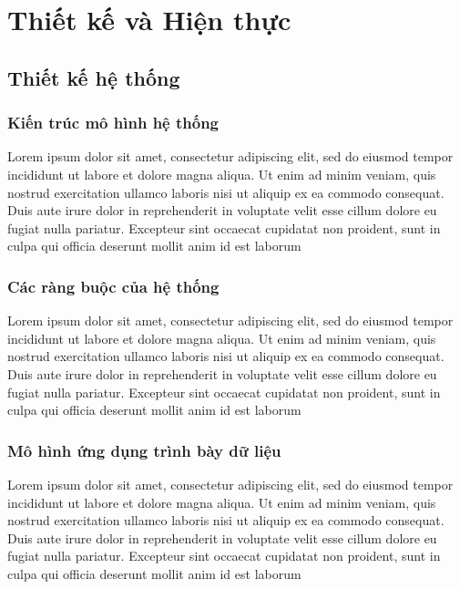 \ifpdf
\graphicspath{{Chapter3/Figs/Raster/}{Chapter3/Figs/PDF/}{Chapter3/Figs/}}
\else
\graphicspath{{Chapter3/Figs/Vector/}{Chapter3/Figs/}}
\fi

\chapter{Thiết kế và Hiện thực}

\section{Thiết kế hệ thống}
\subsection{Kiến trúc mô hình hệ thống}
Lorem ipsum dolor sit amet, consectetur adipiscing elit, sed do eiusmod tempor incididunt ut labore et dolore magna aliqua. Ut enim ad minim veniam, quis nostrud exercitation ullamco laboris nisi ut aliquip ex ea commodo consequat. Duis aute irure dolor in reprehenderit in voluptate velit esse cillum dolore eu fugiat nulla pariatur. Excepteur sint occaecat cupidatat non proident, sunt in culpa qui officia deserunt mollit anim id est laborum
\subsection{Các ràng buộc của hệ thống}
Lorem ipsum dolor sit amet, consectetur adipiscing elit, sed do eiusmod tempor incididunt ut labore et dolore magna aliqua. Ut enim ad minim veniam, quis nostrud exercitation ullamco laboris nisi ut aliquip ex ea commodo consequat. Duis aute irure dolor in reprehenderit in voluptate velit esse cillum dolore eu fugiat nulla pariatur. Excepteur sint occaecat cupidatat non proident, sunt in culpa qui officia deserunt mollit anim id est laborum
\subsection{Mô hình ứng dụng trình bày dữ liệu}
Lorem ipsum dolor sit amet, consectetur adipiscing elit, sed do eiusmod tempor incididunt ut labore et dolore magna aliqua. Ut enim ad minim veniam, quis nostrud exercitation ullamco laboris nisi ut aliquip ex ea commodo consequat. Duis aute irure dolor in reprehenderit in voluptate velit esse cillum dolore eu fugiat nulla pariatur. Excepteur sint occaecat cupidatat non proident, sunt in culpa qui officia deserunt mollit anim id est laborum
